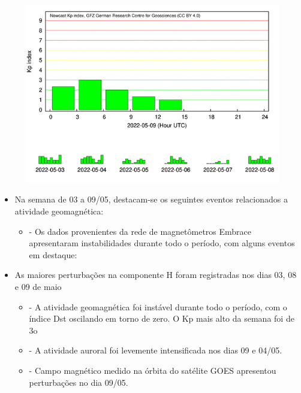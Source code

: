 \documentclass[11pt, oneside]{article}
\begin{document}
                     \begin{figure}[H]
    
                        \centering
   
                             \includegraphics[width=14cm]{./figures//figureGeomag_6.png}

                        \end{figure}

                     \begin{itemize} 
\item Na semana de 03 a 09/05, destacam-se os seguintes eventos relacionados a atividade geomagnética:
\begin{itemize} 
 \item - Os dados provenientes da rede de magnetômetros Embrace apresentaram instabilidades durante todo o período, com alguns eventos em destaque:
 \end{itemize} 
\item As maiores perturbações na componente H foram registradas nos dias 03, 08 e 09 de maio
\begin{itemize} 
 \item - A atividade geomagnética foi instável durante todo o período, com o índice Dst oscilando em torno de zero. O Kp mais alto da semana foi de 3o
 \end{itemize} 
\begin{itemize} 
 \item - A atividade auroral foi levemente intensificada nos dias 09 e 04/05.
 \end{itemize} 
\begin{itemize} 
 \item - Campo magnético medido na órbita do satélite GOES apresentou perturbações no dia 09/05.
 \end{itemize} 
\end{itemize} 
\end{document}
